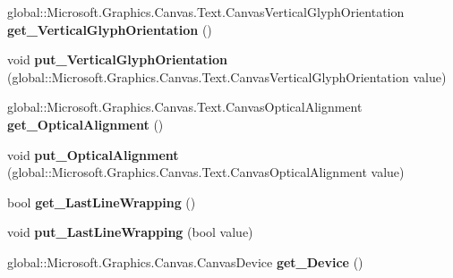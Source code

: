\begin{DoxyCompactItemize}
global\+::\+Microsoft.\+Graphics.\+Canvas.\+Text.\+Canvas\+Vertical\+Glyph\+Orientation {\bfseries get\+\_\+\+Vertical\+Glyph\+Orientation} ()
\item 
\mbox{\label{interface_microsoft_1_1_graphics_1_1_canvas_1_1_text_1_1_i_canvas_text_layout_a3745c348ddbf627ac42f367bde371029}} 
void {\bfseries put\+\_\+\+Vertical\+Glyph\+Orientation} (global\+::\+Microsoft.\+Graphics.\+Canvas.\+Text.\+Canvas\+Vertical\+Glyph\+Orientation value)
\item 
\mbox{\label{interface_microsoft_1_1_graphics_1_1_canvas_1_1_text_1_1_i_canvas_text_layout_a6f53ec2716648f680f6930ed036d8ee3}} 
global\+::\+Microsoft.\+Graphics.\+Canvas.\+Text.\+Canvas\+Optical\+Alignment {\bfseries get\+\_\+\+Optical\+Alignment} ()
\item 
\mbox{\label{interface_microsoft_1_1_graphics_1_1_canvas_1_1_text_1_1_i_canvas_text_layout_a766a153760270ab2c01c112374543791}} 
void {\bfseries put\+\_\+\+Optical\+Alignment} (global\+::\+Microsoft.\+Graphics.\+Canvas.\+Text.\+Canvas\+Optical\+Alignment value)
\item 
\mbox{\label{interface_microsoft_1_1_graphics_1_1_canvas_1_1_text_1_1_i_canvas_text_layout_af335bf16dd7057ce2706ba964c165998}} 
bool {\bfseries get\+\_\+\+Last\+Line\+Wrapping} ()
\item 
\mbox{\label{interface_microsoft_1_1_graphics_1_1_canvas_1_1_text_1_1_i_canvas_text_layout_adeb3fc37708660c2d3ff7a49349a4f43}} 
void {\bfseries put\+\_\+\+Last\+Line\+Wrapping} (bool value)
\item 
\mbox{\label{interface_microsoft_1_1_graphics_1_1_canvas_1_1_text_1_1_i_canvas_text_layout_ac15a95c4a7796e189425d1953df24949}} 
global\+::\+Microsoft.\+Graphics.\+Canvas.\+Canvas\+Device {\bfseries get\+\_\+\+Device} ()
\item 

\end{DoxyCompactItemize}
